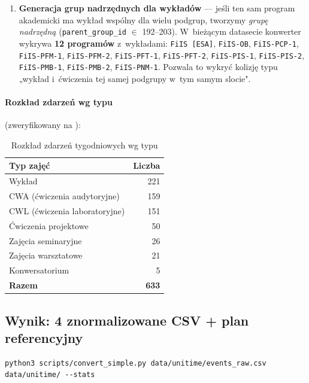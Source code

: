 \documentclass{common/sprawozdanie-agh}
\begin{document}
\begin{enumerate}
\item \textbf{Generacja grup nadrzędnych dla wykładów} --- jeśli ten sam program akademicki ma wykład wspólny dla wielu podgrup, tworzymy \emph{grupę nadrzędną} (\texttt{parent\_group\_id} $\in$ 192--203). W~bieżącym datasecie konwerter wykrywa \textbf{12 programów} z~wykładami: \texttt{FiIS\,[ESA]}, \texttt{FiIS-OB}, \texttt{FiIS-PCP-1}, \texttt{FiIS-PFM-1}, \texttt{FiIS-PFM-2}, \texttt{FiIS-PFT-1}, \texttt{FiIS-PFT-2}, \texttt{FiIS-PIS-1}, \texttt{FiIS-PIS-2}, \texttt{FiIS-PMB-1}, \texttt{FiIS-PMB-2}, \texttt{FiIS-PNM-1}. Pozwala to wykryć kolizję typu „wykład i~ćwiczenia tej samej podgrupy w~tym samym slocie".
\end{enumerate}

\paragraph{Rozkład zdarzeń wg typu} (zweryfikowany na ):

\begin{table}[H]
\centering\small
\begin{tabular}{lr}
\toprule
\textbf{Typ zajęć} & \textbf{Liczba} \\
\midrule
Wykład                  & 221 \\
CWA (ćwiczenia audytoryjne)  & 159 \\
CWL (ćwiczenia laboratoryjne) & 151 \\
Ćwiczenia projektowe    & 50 \\
Zajęcia seminaryjne     & 26 \\
Zajęcia warsztatowe     & 21 \\
Konwersatorium          & 5 \\
\midrule
\textbf{Razem}          & \textbf{633} \\
\bottomrule
\end{tabular}
\caption{Rozkład zdarzeń tygodniowych wg typu}
\end{table}

\subsection{Wynik: 4 znormalizowane CSV + plan referencyjny}

\begin{lstlisting}[style=bashstyle, caption={Wywołanie skryptu konwersji}]
python3 scripts/convert_simple.py data/unitime/events_raw.csv data/unitime/ --stats
\end{lstlisting}
\end{document}
